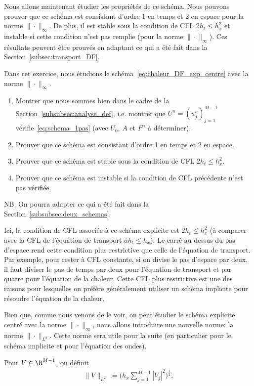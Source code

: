\documentclass[12pt,a4paper,twoside]{article}
\begin{document}
Nous allons maintenant \'etudier les propri\'et\'es de ce sch\'ema.
Nous pouvons prouver que ce sch\'ema est consistant d'ordre 1 en temps et 2 en espace
pour la norme $\| \cdot \|_{\infty}$.
De plus, il est stable sous la condition de CFL $2 h_t \leq h_x^2$ 
et instable si cette condition n'est
pas remplie (pour la norme $\| \cdot \|_{\infty}$).
Ces r\'esultats peuvent \^etre prouv\'es en adaptant ce qui a \'et\'e fait dans
la Section~\ref{subsec:transport_DF}.

\begin{exercise}
  \label{exo:chaleur_explicite}
  Dans cet exercice, nous \'etudions le sch\'ema~\eqref{eq:chaleur_DF_exp_centre}
  avec la norme $\| \cdot \|_{\infty}$.
  \begin{enumerate}
  \item Montrer que nous sommes bien dans le cadre de la Section~\ref{subsubsec:analyse_def},
    i.e. montrer que $U^n = (u_j^n)_{j=1}^{M-1}$ v\'erifie~\eqref{eq:schema_1pas}
    (avec $U_0$, $A$ et $F^n$ \`a d\'eterminer).
  \item Prouver que ce sch\'ema est consistant d'ordre 1 en temps et 2 en espace.
  \item Prouver que ce sch\'ema est stable sous la condition de CFL
    $2 h_t \leq h_x^2$.
  \item Prouver que ce sch\'ema est instable si la condition de CFL
    pr\'ec\'edente n'est pas v\'erifi\'ee.
  \end{enumerate}
  NB: On pourra adapter ce qui a \'et\'e fait dans la Section~\ref{subsubsec:deux_schemas}.
\end{exercise}

\begin{remark}
  Ici, la condition de CFL associ\'ee \`a ce sch\'ema explicite est
  $2 h_t \leq h_x^2$ (\`a comparer avec la CFL de l'\'equation de transport
  $a h_t \leq h_x$). Le carr\'e au dessus du pas d'espace rend cette condition plus restrictive
  que celle de l'\'equation de transport. Par exemple, pour rester \`a CFL constante,
  si on divise le pas d'espace par deux, il faut diviser le pas de temps par deux pour l'\'equation
  de transport et par quatre pour l'\'equation de la chaleur.
  Cette CFL plus restrictive est une des raisons pour lesquelles on pr\'ef\`ere g\'en\'eralement
  utiliser un sch\'ema implicite pour r\'esoudre l'\'equation de la chaleur.
\end{remark}

Bien que, comme nous venons de le voir, on peut \'etudier le sch\'ema explicite centr\'e
avec la norme $\| \cdot \|_{\infty}$, nous allons introduire une nouvelle norme:
la norme $\| \cdot \|_{L^2}$. Cette norme sera utile pour la suite
(en particulier pour le sch\'ema implicite et pour l'\'equation des ondes).
\begin{definition}
  Pour $V \in \R^{M-1}$, on d\'efinit
  \begin{align}
    \| V \|_{L^2} := \Big( h_x \sum_{j=1}^{M-1} |V_j|^2 \Big)^{\frac12}.
  \end{align}
\end{definition}
\end{document}
